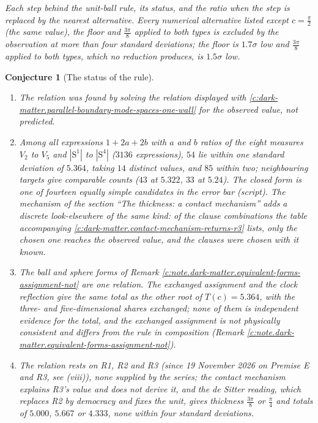 \documentclass[11pt]{article}
\newtheorem{conjecture}[theorem]{Conjecture}
\theoremstyle{definition}
\theoremstyle{plain}
\newcommand{\changedmark}[2]{\marginpar{\raggedright\scriptsize\color{#1}#2}}
\providecommand{\Sph}{}\renewcommand{\Sph}{\mathrm{S}}
\begin{document}
\emph{Each step behind the unit-ball rule, its status, and the ratio when the step is replaced by the nearest alternative. Every numerical alternative listed except $c = \tfrac{\pi}{2}$ (the same value), the floor and $\tfrac{3\pi}{8}$ applied to both types is excluded by the observation at more than four standard deviations; the floor is $1.7\sigma$ low and $\tfrac{3\pi}{8}$ applied to both types, which no reduction produces, is $1.5\sigma$ low.}

\begin{conjecture}[The status of the rule]\label{c:dark-matter.status-rule}
\changedmark{BurntOrange}{changed since the deposit}
\begin{enumerate}
\item[(i)] The relation was found by solving the relation displayed with \ref{c:dark-matter.parallel-boundary-mode-spaces-one-wall} for the observed value, not predicted.
\item[(ii)] Among all expressions $1 + 2a + 2b$ with $a$ and $b$ ratios of the eight measures $V_{2}$ to $V_{5}$ and $|\Sph^{1}|$ to $|\Sph^{4}|$ ($3136$ expressions), $54$ lie within one standard deviation of $5.364$, taking $14$ distinct values, and $85$ within two; neighbouring targets give comparable counts ($43$ at $5.322$, $33$ at $5.24$). The closed form is one of fourteen equally simple candidates in the error bar (script). The mechanism of the section ``The thickness: a contact mechanism'' adds a discrete look-elsewhere of the same kind: of the clause combinations the table accompanying \ref{c:dark-matter.contact-mechanism-returns-r3} lists, only the chosen one reaches the observed value, and the clauses were chosen with it known.
\item[(iii)] The ball and sphere forms of Remark \ref{c:note.dark-matter.equivalent-forms-assignment-not} are one relation. The exchanged assignment and the clock reflection give the same total as the other root of $T(c) = 5.364$, with the three- and five-dimensional shares exchanged; none of them is independent evidence for the total, and the exchanged assignment is not physically consistent and differs from the rule in composition (Remark \ref{c:note.dark-matter.equivalent-forms-assignment-not}).
\item[(iv)] The relation rests on R1, R2 and R3 (since 19 November 2026 on Premise E and R3, see (viii)), none supplied by the series; the contact mechanism explains R3's value and does not derive it, and the de Sitter reading, which replaces R2 by democracy and fixes the unit, gives thickness $\tfrac{3\pi}{8}$ or $\tfrac{\pi}{4}$ and totals of $5.000$, $5.667$ or $4.333$, none within four standard deviations.

\end{enumerate}
\end{conjecture}
\end{document}
